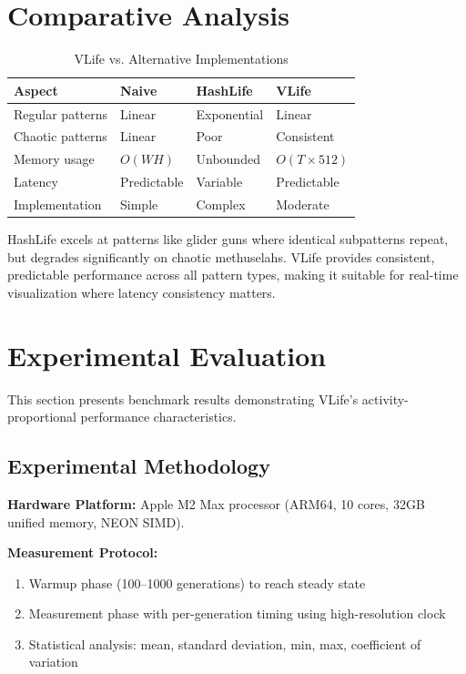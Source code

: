 \documentclass[11pt]{article}
\theoremstyle{definition}
\begin{document}
    \section{Comparative Analysis}

    \begin{table}[h]
        \centering
        \caption{VLife vs. Alternative Implementations}
        \begin{tabular}{@{}llll@{}}
            \toprule
            \textbf{Aspect} & \textbf{Naive} & \textbf{HashLife} & \textbf{VLife} \\
            \midrule
            Regular patterns & Linear & Exponential & Linear \\
            Chaotic patterns & Linear & Poor & Consistent \\
            Memory usage & $O(WH)$ & Unbounded & $O(T \times 512)$ \\
            Latency & Predictable & Variable & Predictable \\
            Implementation & Simple & Complex & Moderate \\
            \bottomrule
        \end{tabular}
    \end{table}

    HashLife excels at patterns like glider guns where identical subpatterns repeat, but degrades significantly on chaotic methuselahs. VLife provides consistent, predictable performance across all pattern types, making it suitable for real-time visualization where latency consistency matters.

    \section{Experimental Evaluation}

    This section presents benchmark results demonstrating VLife's activity-proportional performance characteristics.

    \subsection{Experimental Methodology}

    \textbf{Hardware Platform:} Apple M2 Max processor (ARM64, 10 cores, 32GB unified memory, NEON SIMD).

    \textbf{Measurement Protocol:}
    \begin{enumerate}
        \item Warmup phase (100--1000 generations) to reach steady state
        \item Measurement phase with per-generation timing using high-resolution clock
        \item Statistical analysis: mean, standard deviation, min, max, coefficient of variation
    \end{enumerate}
\end{document}
